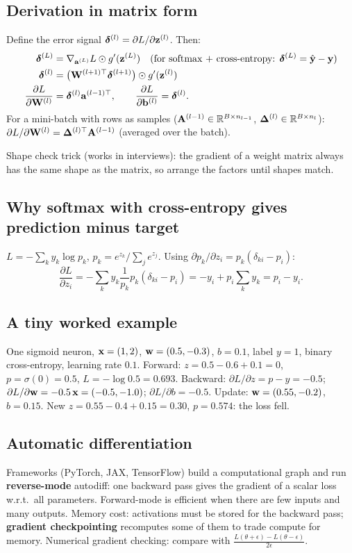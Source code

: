 \subsection{Derivation in matrix form}
Define the error signal $\bm\delta^{(l)}=\partial L/\partial\mathbf{z}^{(l)}$. Then:
\begin{align*}
\bm\delta^{(L)}&=\nabla_{\mathbf{a}^{(L)}}L\odot g'(\mathbf{z}^{(L)})\quad(\text{for softmax + cross-entropy: }\bm\delta^{(L)}=\hat{\mathbf{y}}-\mathbf{y})\\
\bm\delta^{(l)}&=\big(\mathbf{W}^{(l+1)\top}\bm\delta^{(l+1)}\big)\odot g'(\mathbf{z}^{(l)})\\
\frac{\partial L}{\partial\mathbf{W}^{(l)}}&=\bm\delta^{(l)}\mathbf{a}^{(l-1)\top},\qquad\frac{\partial L}{\partial\mathbf{b}^{(l)}}=\bm\delta^{(l)}.
\end{align*}
For a mini-batch with rows as samples ($\mathbf{A}^{(l-1)}\in\mathbb{R}^{B\times n_{l-1}}$, $\bm\Delta^{(l)}\in\mathbb{R}^{B\times n_l}$): $\partial L/\partial\mathbf{W}^{(l)}=\bm\Delta^{(l)\top}\mathbf{A}^{(l-1)}$ (averaged over the batch).

Shape check trick (works in interviews): the gradient of a weight matrix always has the same shape as the matrix, so arrange the factors until shapes match.

\subsection{Why softmax with cross-entropy gives prediction minus target}
$L=-\sum_ky_k\log p_k$, $p_k=e^{z_k}/\sum_je^{z_j}$. Using $\partial p_k/\partial z_i=p_k(\delta_{ki}-p_i)$:
\[\frac{\partial L}{\partial z_i}=-\sum_ky_k\frac{1}{p_k}p_k(\delta_{ki}-p_i)=-y_i+p_i\sum_ky_k=p_i-y_i.\]

\subsection{A tiny worked example}
One sigmoid neuron, $\mathbf{x}=(1,2)$, $\mathbf{w}=(0.5,-0.3)$, $b=0.1$, label $y=1$, binary cross-entropy, learning rate $0.1$.
Forward: $z=0.5-0.6+0.1=0$, $p=\sigma(0)=0.5$, $L=-\log0.5=0.693$.
Backward: $\partial L/\partial z=p-y=-0.5$; $\partial L/\partial\mathbf{w}=-0.5\,\mathbf{x}=(-0.5,-1.0)$; $\partial L/\partial b=-0.5$.
Update: $\mathbf{w}=(0.55,-0.2)$, $b=0.15$. New $z=0.55-0.4+0.15=0.30$, $p=0.574$: the loss fell.

\subsection{Automatic differentiation}
Frameworks (PyTorch, JAX, TensorFlow) build a computational graph and run \textbf{reverse-mode} autodiff: one backward pass gives the gradient of a scalar loss w.r.t.\ all parameters. Forward-mode is efficient when there are few inputs and many outputs. Memory cost: activations must be stored for the backward pass; \textbf{gradient checkpointing} recomputes some of them to trade compute for memory. Numerical gradient checking: compare with $\frac{L(\theta+\epsilon)-L(\theta-\epsilon)}{2\epsilon}$.


